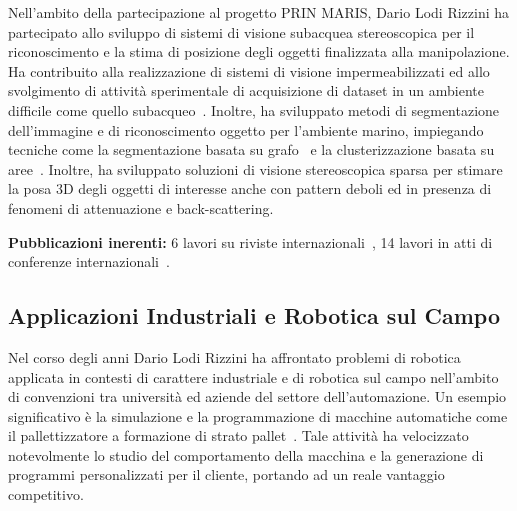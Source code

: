 \documentclass[11pt]{article}
\begin{document}
\begin{itemize}
Nell'ambito della partecipazione al progetto PRIN MARIS,
Dario Lodi Rizzini ha partecipato allo sviluppo di sistemi di visione subacquea stereoscopica 
per il riconoscimento e la stima di posizione degli oggetti finalizzata alla manipolazione. 
Ha contribuito alla realizzazione di sistemi di visione impermeabilizzati ed allo svolgimento
di attivit\`a sperimentale di acquisizione di dataset in un ambiente difficile come quello 
subacqueo~\cite{oleari2014ifac,oleari2015oceans}.
Inoltre, ha sviluppato metodi di segmentazione dell'immagine e di riconoscimento oggetto per l'ambiente marino, 
impiegando tecniche come la segmentazione basata su grafo~\cite{kallasi2015oceans} e 
la clusterizzazione basata su aree~\cite{lodirizzini2015ijars,oleari2014ifac,kallasi2014amra}.
Inoltre, ha sviluppato soluzioni di visione stereoscopica sparsa per stimare la posa 3D 
degli oggetti di interesse anche con pattern deboli ed in presenza di fenomeni di attenuazione 
e back-scattering. 


\textbf{Pubblicazioni inerenti:}
6 lavori su riviste internazionali~\cite{aleotti2021ap, simetti2018joe,lodirizzini2017caee,casalino2016mtsj,lodirizzini2015ijars,aleotti2014jirs},
14 lavori in atti di conferenze internazionali~\cite{fontana2021ecmr, fontana2021iccp, monica2020irc, chiaravalli2020etfa, oleari2016iecon, kallasi2015oceans, oleari2015oceans, aleotti2014iros, oleari2014ifac, lodirizzini2014ias, kallasi2014iarp, oleari2013iccp, aleotti2012icra, kallasi2014amra}.

\subsection*{Applicazioni Industriali e Robotica sul Campo}

Nel corso degli anni Dario Lodi Rizzini ha affrontato problemi di robotica applicata in contesti 
di carattere industriale e di robotica sul campo nell'ambito di convenzioni tra universit\`a 
ed aziende del settore dell'automazione. 
Un esempio significativo \`e la simulazione e la programmazione di macchine automatiche 
come il pallettizzatore a formazione di strato pallet~\cite{argenti2010isr,calo2012icinco}. 
Tale attivit\`a ha velocizzato notevolmente lo studio del comportamento della macchina e 
la generazione di programmi personalizzati per il cliente, portando ad un reale vantaggio competitivo. 


\end{itemize}
\end{document}
